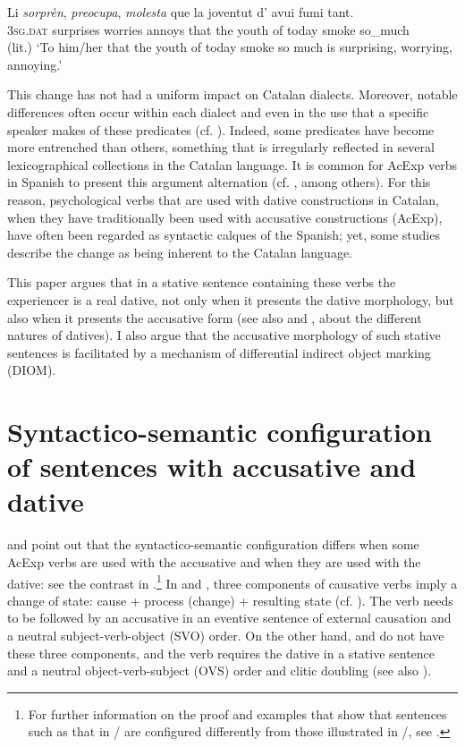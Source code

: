 \documentclass[output=paper,colorlinks,citecolor=brown,modfonts,nonflat]{langsci/langscibook}
\begin{document}
 \ex \label{ex:royo:2b}
 \gll Li \emph{sorprèn}, \emph{preocupa}, \emph{molesta} que la joventut d’ avui fumi tant.\\
\textsc{3sg.dat} surprises worries    annoys  that the youth     of today smoke so\_much\\
 \glt	(lit.) ‘To him/her that the youth of today smoke so much is surprising, worrying, annoying.’

 \z
 \z


This change has not had a uniform impact on Catalan dialects. Moreover, notable differences often occur within each dialect and even in the use that a specific speaker makes of these predicates (cf. \citealt[70]{CabréMateu1998}). Indeed, some predicates have become more entrenched than others, something that is irregularly reflected in several lexicographical collections in the Catalan language. It is common for AcExp verbs in Spanish to present this argument alternation (cf. \citealt{MendivilGiro2005, MarínMcNally2011}, among others). For this reason, psychological verbs that are used with dative constructions in Catalan, when they have traditionally been used with accusative constructions (AcExp), have often been regarded as syntactic calques of the Spanish; yet, some studies describe the change as being inherent to the Catalan language.

This paper argues that in a stative sentence containing these verbs the experiencer is a real dative, not only when it presents the dative morphology, but also when it presents the accusative form (see also  and , about the different natures of datives). I also argue that the accusative morphology of such stative sentences is facilitated by a mechanism of differential indirect object marking (DIOM).

\section{Syntactico-semantic configuration of sentences with accusative and dative}\label{sec:royo:2}

\citet{Ynglès1991} and \citet{CabréMateu1998} point out that the syntactico-semantic configuration differs when some AcExp verbs are used with the accusative and when they are used with the dative: see the contrast in .\footnote{For further information on the proof and examples that show that sentences such as that in  / are configured differently from those illustrated in /, see \citet[Section 4.1]{Royo2017}.} In  and , three components of causative verbs imply a change of state: cause + process (change) + resulting state (cf. \citealt{LevinRappaportHovav1995, CabréMateu1998, Rossello2008}). The verb needs to be followed by an accusative in an eventive sentence of external causation and a neutral subject-verb-object (SVO) order. On the other hand,  and  do not have these three components, and the verb requires the dative in a stative sentence and a neutral object-verb-subject (OVS) order and clitic doubling (see also ).
\end{document}

